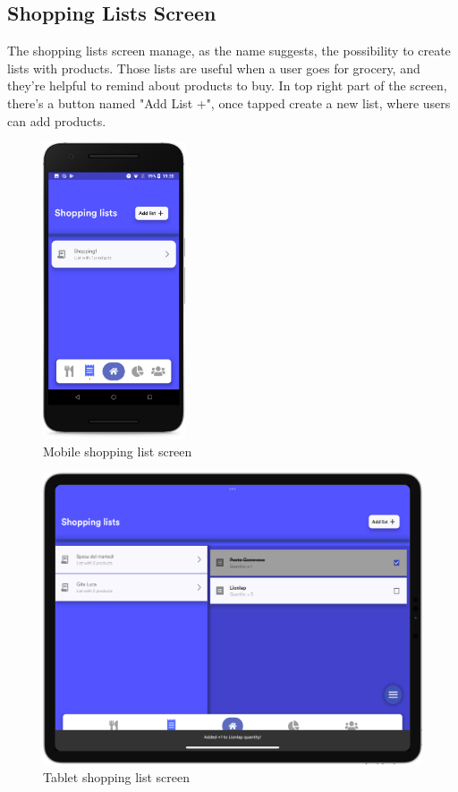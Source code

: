 \subsection{Shopping Lists Screen}
The shopping lists screen manage, as the name suggests, the possibility to create lists with products.
Those lists are useful when a user goes for grocery, and they're helpful to remind about products to buy.
In top right part of the screen, there's a button named "Add List +", once tapped create a new list, where users can add products.\newline

\begin{figure}[H]
  \centering
    \vspace*{-0.3cm}
     \includegraphics[width=42mm,scale=0.9]{./Images//Mobile_mocks/shopping1.png}
     \vspace*{-0.3cm}
     \caption{Mobile shopping list screen}
\end{figure}

\vspace*{-0.3cm}
\begin{figure}[H]
  \centering
    \includegraphics[scale=0.22]{./Images//Tablet_mocks/shopping1.png}
    \vspace*{-0.3cm}
    \caption{Tablet shopping list screen}
\end{figure}